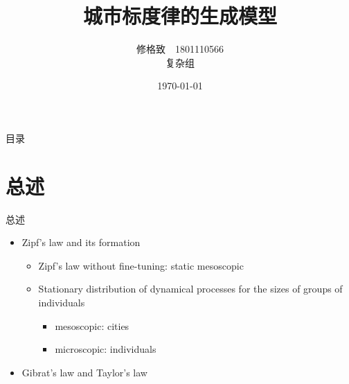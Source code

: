 \documentclass[utf8]{ctexbeamer}
\begin{document}
\title[Growth Models]{城市标度律的生成模型}
\author{修格致\ \ 1801110566 \\ 复杂组}
\date{\today}


\maketitle

\begin{frame}{目录}
    \tableofcontents
\end{frame}

\section{总述}

\begin{frame}{总述}
      \begin{itemize}
    \item Zipf's law and its formation
    \begin{itemize}
      \item Zipf's law without fine-tuning: static mesoscopic
      \item Stationary distribution of dynamical processes for the sizes of groups of individuals
      \begin{itemize}
        \item mesoscopic: cities
        \item microscopic: individuals
      \end{itemize}
    \end{itemize}
    \item Gibrat's law and Taylor's law
  \end{itemize}
\end{frame}
\end{document}
